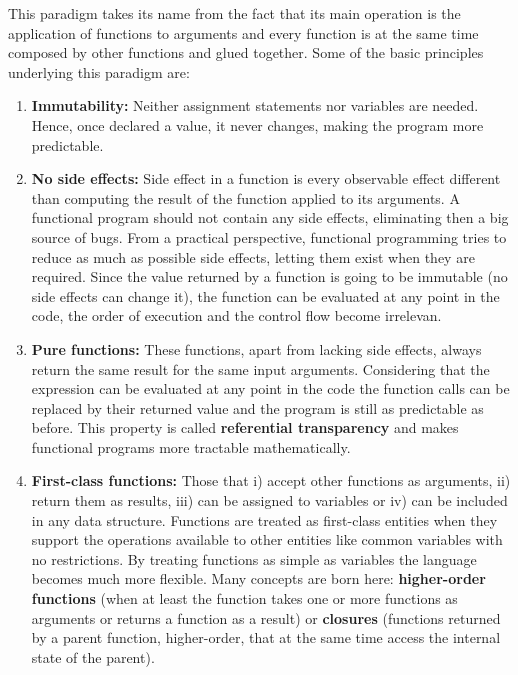 This paradigm takes its name from the fact that its main operation is the application of functions to arguments and 
every function is at the same time composed by other functions and glued together. 
Some of the basic principles underlying this paradigm are:
\begin{enumerate}[noitemsep]
    \item \textbf{Immutability:} Neither assignment statements nor variables are needed.
    Hence, once declared a value, it never changes, making the program more predictable. 
    
    \item \textbf{No side effects:} Side effect in a function is every observable effect different than computing the result of the function applied to its arguments.
    A functional program should not contain any side effects, eliminating then a big source of bugs. 
    From a practical perspective, functional programming tries to reduce as much as possible side effects, letting them exist when they are required. 
    Since the value returned by a function is going to be immutable (no side effects can change it), 
    the function can be evaluated at any point in the code, the order of execution and the control flow become irrelevan.
    
    \item \textbf{Pure functions:} These functions, apart from lacking side effects, always return the same result for the same input arguments.
    Considering that the expression can be evaluated at any point in the code the function calls can be replaced by their returned value and the program is still as predictable as before.  
    This property is called \textbf{referential transparency} and makes functional programs more tractable mathematically. 
    
    \item \textbf{First-class functions:} Those that i) accept other functions as arguments,
    ii) return them as results, iii) can be assigned to variables or iv) can be included in any data structure. 
    Functions are treated as first-class entities when they support the operations available to other entities like common variables with no restrictions. 
    By treating functions as simple as variables the language becomes much more flexible. 
    Many concepts are born here: 
    \textbf{higher-order functions} (when at least the function takes one or more functions as arguments or returns a function as a result) or
    \textbf{closures} (functions returned by a parent function, higher-order, that at the same time access the internal state of the parent).
\end{enumerate}
 
